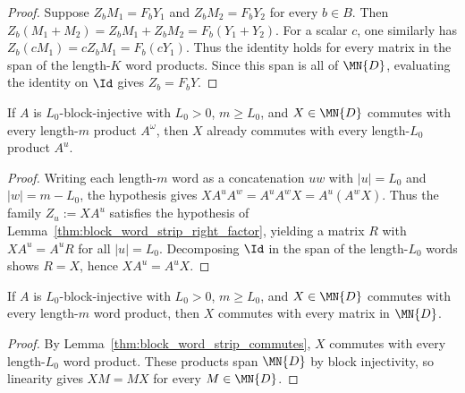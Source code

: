 \begin{proof}
    \leanok
    Suppose $Z_bM_1 = F_bY_1$ and $Z_bM_2 = F_bY_2$ for every $b\in B$. Then
    $Z_b(M_1+M_2) = Z_bM_1+Z_bM_2 = F_b(Y_1+Y_2)$.
    For a scalar $c$, one similarly has
    $Z_b(cM_1) = cZ_bM_1 = F_b(cY_1)$. Thus the identity holds for every
    matrix in the span of the length-$K$ word products. Since this span is all
    of $\MN{D}$, evaluating the identity on $\Id$ gives $Z_b = F_b Y$.
\end{proof}

\begin{lemma}
    \label{thm:block_word_strip_commutes}
    \leanok
    If $A$ is $L_0$-block-injective with $L_0 > 0$, $m \ge L_0$, and
    $X \in \MN{D}$ commutes with every length-$m$ product $A^\omega$, then $X$
    already commutes with every length-$L_0$ product $A^u$.
\end{lemma}

\begin{proof}
    \leanok
    Writing each length-$m$ word as a concatenation $uw$ with $|u| = L_0$ and
    $|w| = m - L_0$, the hypothesis gives
    $X A^u A^w = A^u A^w X = A^u(A^w X)$.
    Thus the family $Z_u := X A^u$ satisfies the hypothesis of
    Lemma~\ref{thm:block_word_strip_right_factor}, yielding a matrix $R$ with
    $X A^u = A^u R$ for all $|u| = L_0$. Decomposing $\Id$ in the span of the
    length-$L_0$ words shows $R = X$, hence $X A^u = A^u X$.
\end{proof}

\begin{lemma}
    \label{thm:block_word_strip_central}
    \leanok
    If $A$ is $L_0$-block-injective with $L_0 > 0$, $m \ge L_0$, and
    $X \in \MN{D}$ commutes with every length-$m$ word product, then $X$
    commutes with every matrix in $\MN{D}$.
\end{lemma}

\begin{proof}
    \leanok
    By Lemma~\ref{thm:block_word_strip_commutes}, $X$ commutes with every
    length-$L_0$ word product. These products span $\MN{D}$ by block
    injectivity, so linearity gives $XM = MX$ for every $M \in \MN{D}$.
\end{proof}

